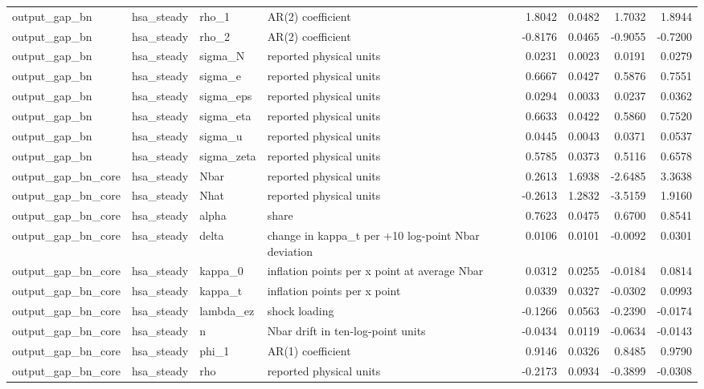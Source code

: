 \begin{tabular}{llllrrrr}
output\_gap\_bn & hsa\_steady & rho\_1 & AR(2) coefficient & 1.8042 & 0.0482 & 1.7032 & 1.8944 \\
output\_gap\_bn & hsa\_steady & rho\_2 & AR(2) coefficient & -0.8176 & 0.0465 & -0.9055 & -0.7200 \\
output\_gap\_bn & hsa\_steady & sigma\_N & reported physical units & 0.0231 & 0.0023 & 0.0191 & 0.0279 \\
output\_gap\_bn & hsa\_steady & sigma\_e & reported physical units & 0.6667 & 0.0427 & 0.5876 & 0.7551 \\
output\_gap\_bn & hsa\_steady & sigma\_eps & reported physical units & 0.0294 & 0.0033 & 0.0237 & 0.0362 \\
output\_gap\_bn & hsa\_steady & sigma\_eta & reported physical units & 0.6633 & 0.0422 & 0.5860 & 0.7520 \\
output\_gap\_bn & hsa\_steady & sigma\_u & reported physical units & 0.0445 & 0.0043 & 0.0371 & 0.0537 \\
output\_gap\_bn & hsa\_steady & sigma\_zeta & reported physical units & 0.5785 & 0.0373 & 0.5116 & 0.6578 \\
output\_gap\_bn\_core & hsa\_steady & Nbar & reported physical units & 0.2613 & 1.6938 & -2.6485 & 3.3638 \\
output\_gap\_bn\_core & hsa\_steady & Nhat & reported physical units & -0.2613 & 1.2832 & -3.5159 & 1.9160 \\
output\_gap\_bn\_core & hsa\_steady & alpha & share & 0.7623 & 0.0475 & 0.6700 & 0.8541 \\
output\_gap\_bn\_core & hsa\_steady & delta & change in kappa\_t per +10 log-point Nbar deviation & 0.0106 & 0.0101 & -0.0092 & 0.0301 \\
output\_gap\_bn\_core & hsa\_steady & kappa\_0 & inflation points per x point at average Nbar & 0.0312 & 0.0255 & -0.0184 & 0.0814 \\
output\_gap\_bn\_core & hsa\_steady & kappa\_t & inflation points per x point & 0.0339 & 0.0327 & -0.0302 & 0.0993 \\
output\_gap\_bn\_core & hsa\_steady & lambda\_ez & shock loading & -0.1266 & 0.0563 & -0.2390 & -0.0174 \\
output\_gap\_bn\_core & hsa\_steady & n & Nbar drift in ten-log-point units & -0.0434 & 0.0119 & -0.0634 & -0.0143 \\
output\_gap\_bn\_core & hsa\_steady & phi\_1 & AR(1) coefficient & 0.9146 & 0.0326 & 0.8485 & 0.9790 \\
output\_gap\_bn\_core & hsa\_steady & rho & reported physical units & -0.2173 & 0.0934 & -0.3899 & -0.0308 \\

\end{tabular}
